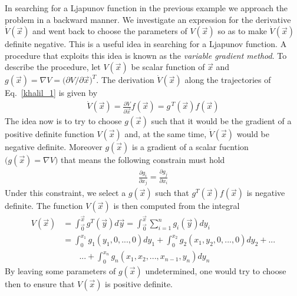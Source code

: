 \documentclass[12pt,a4paper,oneside]{book}
\begin{document}
\begin{onehalfspace}
In searching for a Ljapunov function in the previous example we approach the 
problem in a backward manner. We investigate an expression for the derivative 
$\dot{V}(\vec{x})$ and went back to choose the parameters of $V(\vec{x})$ so as 
to make $\dot{V}(\vec{x})$ definite negative. This is a useful idea in 
searching for a Ljapunov function. A procedure that exploits this idea is known 
as the \textit{variable gradient method}. To describe the procedure, let 
$V(\vec{x})$ be scalar function of $\vec{x}$ and $g(\vec{x})=\nabla 
V=\big(\partial V/\partial \vec{x}\big)^T$. The derivation $\dot{V}(\vec{x})$ 
along the trajectories of Eq.~\eqref{khalil_1} is given by
\begin{equation*}
	\begin{aligned}
		\dot{V}(\vec{x})=\frac{\partial V}{\partial 
		\vec{x}}f(\vec{x})=g^{\,T}(\vec{x})f(\vec{x})
	\end{aligned}
\end{equation*}
The idea now is to try to choose $g(\vec{x})$ such that it would be the 
gradient of a positive definite function $V(\vec{x})$ and, at the same time, 
$\dot{V}(\vec{x})$ would be negative definite. Moreover $g(\vec{x})$ is a 
gradient of a scalar fucntion $\big(g(\vec{x})=\nabla V\big)$ that means the 
following constrain must hold
\begin{equation*}
	\begin{aligned}
		\frac{\partial g_i}{\partial x_j} = \frac{\partial g_j}{\partial x_i}
	\end{aligned}
\end{equation*}
Under this constraint, we select a $g(\vec{x})$ such that 
$g^T(\vec{x})f(\vec{x})$ is negative definite. The function $V(\vec{x})$ is 
then computed from the integral
\begin{equation*}
	\begin{aligned}
		V(\vec{x})&=\int_{\vec{0}}^{\vec{x}}g^T(\vec{y})d\vec{y} = 
		\int_{\vec{0}}^{\vec{x}}\sum_{i=1}^{n}g_i(\vec{y})dy_i \\[6pt]
		&=\int_{0}^{x_1}g_1(y_1,0,...,0)dy_1+\int_{0}^{x_2} 
		g_2(x_1,y_2,0,...,0) dy_2 + ...\\[6pt]
		&\qquad ...+\int_{0}^{x_n}g_n(x_1,x_2,...,x_{n-1},y_n)dy_n
	\end{aligned}
\end{equation*}
By leaving some parameters of $g(\vec{x})$ undetermined, one would try to 
choose then to ensure that $V(\vec{x})$ is positive definite. 


\end{onehalfspace}
\end{document}
